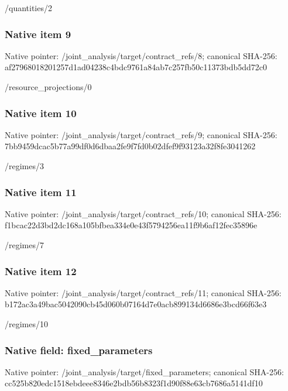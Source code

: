 \documentclass[10pt,a4paper]{article}
\begin{document}
\begingroup\raggedright\sloppy /\allowbreak{}quantities/\allowbreak{}2\par\endgroup

\subsubsection{Native item 9}
Native pointer: /joint\_\allowbreak{}analysis/target/contract\_\allowbreak{}refs/8; canonical SHA-256: af27968018201257d1ad04238c4bdc9761a84ab7c257fb50c11373bdb5dd72c0

\begingroup\raggedright\sloppy /\allowbreak{}resource\_\allowbreak{}projections/\allowbreak{}0\par\endgroup

\subsubsection{Native item 10}
Native pointer: /joint\_\allowbreak{}analysis/target/contract\_\allowbreak{}refs/9; canonical SHA-256: 7bb9459dcac5b77a99df0d6dbaa2fe9f7fd0b02dfef9f93123a32f8fe3041262

\begingroup\raggedright\sloppy /\allowbreak{}regimes/\allowbreak{}3\par\endgroup

\subsubsection{Native item 11}
Native pointer: /joint\_\allowbreak{}analysis/target/contract\_\allowbreak{}refs/10; canonical SHA-256: f1bcac22d3bd2dc168a105bfbea334e0e43f5794256ea11f9b6af12fec35896e

\begingroup\raggedright\sloppy /\allowbreak{}regimes/\allowbreak{}7\par\endgroup

\subsubsection{Native item 12}
Native pointer: /joint\_\allowbreak{}analysis/target/contract\_\allowbreak{}refs/11; canonical SHA-256: b172ac3a49bac5042090cb45d060b07164d7e0acb899134d6686e3bcd66f63e3

\begingroup\raggedright\sloppy /\allowbreak{}regimes/\allowbreak{}10\par\endgroup

\subsubsection{Native field: fixed\_\allowbreak{}parameters}
Native pointer: /joint\_\allowbreak{}analysis/target/fixed\_\allowbreak{}parameters; canonical SHA-256: cc525b820edc1518ebdeee8346e2bdb56b8323f1d90f88e63cb7686a5141df10
\end{document}
